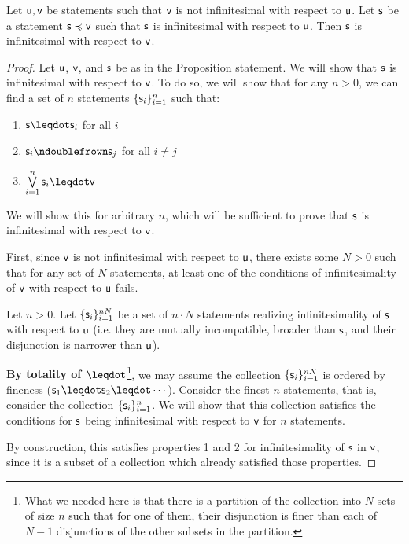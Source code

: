 \documentclass{article}
\begin{document}
\begin{prop}
Let $\stmt[u],\stmt[v]$ be statements such that $\stmt[v]$ is not infinitesimal with respect to $\stmt[u]$. Let $\stmt$ be a statement $\stmt\narrower\stmt[v]$ such that $\stmt$ is infinitesimal with respect to $\stmt[u]$. Then $\stmt$ is infinitesimal with respect to $\stmt[v]$. 
\end{prop}
\begin{proof}
Let $\stmt[u]$, $\stmt[v]$, and $\stmt$ be as in the Proposition statement. We will show that $\stmt$ is infinitesimal with respect to $\stmt[v]$. To do so, we will show that for any $n>0$, we can find a set of $n$ statements $\{\stmt_i\}_{i=1}^n$ such that: 
\begin{enumerate}
    \item $\stmt \finer \stmt_i$ for all $i$
    \item $\stmt_i \ncomp \stmt_j$ for all $i \neq j$
    \item $\bigOR\limits_{i=1}^n \stmt_i \finer \stmt[v]$ 
\end{enumerate}
We will show this for arbitrary $n$, which will be sufficient to prove that $\stmt$ is infinitesimal with respect to $\stmt[v]$. 

First, since $\stmt[v]$ is not infinitesimal with respect to $\stmt[u]$, there exists some $N>0$ such that for any set of $N$ statements, at least one of the conditions of infinitesimality of $\stmt[v]$ with respect to $\stmt[u]$ fails. 

Let $n>0$. Let $\{\stmt_i\}_{i=1}^{nN}$ be a set of $n\cdot N$ statements realizing infinitesimality of $\stmt$ with respect to $\stmt[u]$ (i.e. they are mutually incompatible, broader than $\stmt$, and their disjunction is narrower than $\stmt[u]$). 

{\bf By totality of $\finer$}\footnote{What we needed here is that there is a partition of the collection into $N$ sets of size $n$ such that for one of them, their disjunction is finer than each of $N-1$ disjunctions of the other subsets in the partition.}, we may assume the collection $\{\stmt_i\}_{i=1}^{nN}$ is ordered by fineness ($\stmt_1\finer\stmt_2\finer\cdots$). Consider the finest $n$ statements, that is, consider the collection $\{\stmt_i\}_{i=1}^{n}$. We will show that this collection satisfies the conditions for $\stmt$ being infinitesimal with respect to $\stmt[v]$ for $n$ statements. 

By construction, this satisfies properties 1 and 2 for infinitesimality of $\stmt$ in $\stmt[v]$, since it is a subset of a collection which already satisfied those properties. 


\end{proof}
\end{document}
